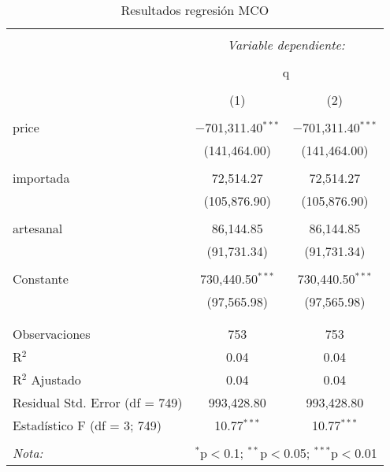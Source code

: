 \documentclass[
]{article}
\begin{document}
\begin{table}[!ht] \centering 
  \caption{Resultados regresión MCO} 
  \label{} 
\begin{tabular}{@{\extracolsep{5pt}}lcc} 
\\[-1.8ex]\hline 
\hline \\[-1.8ex] 
 & \multicolumn{2}{c}{\textit{Variable dependiente:}} \\ 
\cline{2-3} 
\\[-1.8ex] & \multicolumn{2}{c}{q} \\ 
\\[-1.8ex] & (1) & (2)\\ 
\hline \\[-1.8ex] 
 price & $-$701,311.40$^{***}$ & $-$701,311.40$^{***}$ \\ 
  & (141,464.00) & (141,464.00) \\ 
  & & \\ 
 importada & 72,514.27 & 72,514.27 \\ 
  & (105,876.90) & (105,876.90) \\ 
  & & \\ 
 artesanal & 86,144.85 & 86,144.85 \\ 
  & (91,731.34) & (91,731.34) \\ 
  & & \\ 
 Constante & 730,440.50$^{***}$ & 730,440.50$^{***}$ \\ 
  & (97,565.98) & (97,565.98) \\ 
  & & \\ 
\hline \\[-1.8ex] 
Observaciones & 753 & 753 \\ 
R$^{2}$ & 0.04 & 0.04 \\ 
R$^{2}$ Ajustado & 0.04 & 0.04 \\ 
Residual Std. Error (df = 749) & 993,428.80 & 993,428.80 \\ 
Estadístico F (df = 3; 749) & 10.77$^{***}$ & 10.77$^{***}$ \\ 
\hline 
\hline \\[-1.8ex] 
\textit{Nota:}  & \multicolumn{2}{r}{$^{*}$p$<$0.1; $^{**}$p$<$0.05; $^{***}$p$<$0.01} \\ 
\end{tabular} 
\end{table}
\end{document}

